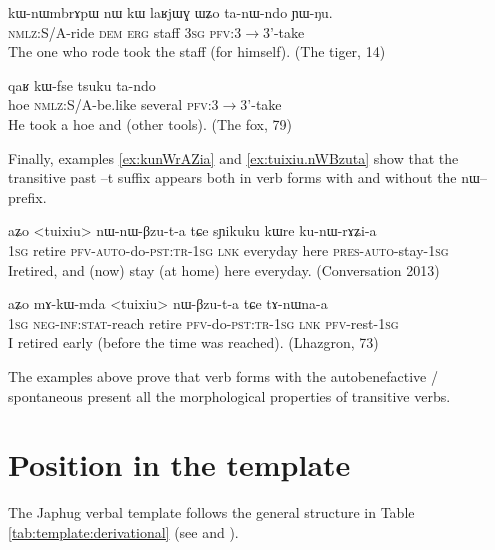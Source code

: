 \documentclass[oldfontcommands,oneside,a4paper,11pt]{article}
\newcommand{\ipa}[1]{{\phon \mbox{#1}}} %
\begin{document}
 \begin{exe}
\ex \label{ex:tAnWndo}
\gll
\ipa{kɯ-nɯmbrɤpɯ} 	\ipa{nɯ} 	\ipa{kɯ} 	\ipa{laʁjɯɣ} 	\ipa{ɯʑo} 	\ipa{ta-nɯ-ndo} 	\ipa{ɲɯ-ŋu.} \\
\textsc{nmlz}:S/A-ride \textsc{dem} \textsc{erg} staff \textsc{3sg} \textsc{pfv}:3$\rightarrow$3'-take  \\ 
\glt The one who rode took the staff (for himself). (The tiger, 14) 
\end{exe}

 \begin{exe}
\ex \label{ex:tando}
\gll 
\ipa{qaʁ} 	\ipa{kɯ-fse} 	\ipa{tsuku} 	\ipa{ta-ndo}  \\
hoe  \textsc{nmlz}:S/A-be.like several \textsc{pfv}:3$\rightarrow$3'-take  \\ 
 \glt He took a hoe and (other tools). (The fox, 79)
\end{exe} 

Finally, examples \ref{ex:kunWrAZia} and \ref{ex:tuixiu.nWBzuta} show that the transitive past \ipa{--t} suffix appears both in verb forms with and without the \ipa{nɯ--} prefix.

 \begin{exe}
\ex \label{ex:kunWrAZia}
\gll 
\ipa{aʑo} 	<tuixiu> 	\ipa{nɯ-nɯ-βzu-t-a} 	\ipa{tɕe} 	\ipa{sɲikuku} 	\ipa{kɯre} 	\ipa{ku-nɯ-rɤʑi-a} \\
\textsc{1sg} retire \textsc{pfv-auto}-do-\textsc{pst:tr-1sg} \textsc{lnk} everyday here \textsc{pres-auto}-stay-\textsc{1sg} \\
\glt Iretired, and (now) stay (at home) here everyday. (Conversation 2013)
\end{exe} 

 \begin{exe}
\ex \label{ex:tuixiu.nWBzuta}
\gll 
\ipa{aʑo} 	\ipa{mɤ-kɯ-mda} 	<tuixiu> 	\ipa{nɯ-βzu-t-a} \ipa{tɕe} 	\ipa{tɤ-nɯna-a} \\
\textsc{1sg} \textsc{neg-inf:stat}-reach retire \textsc{pfv}-do-\textsc{pst:tr-1sg} \textsc{lnk} \textsc{pfv}-rest-\textsc{1sg} \\
\glt I retired early (before the time was reached). (Lhazgron, 73)
\end{exe} 

The examples above prove that verb forms with the autobenefactive / spontaneous present all the morphological  properties of transitive verbs.

\section{Position in the template}
The Japhug verbal template follows the general structure in Table \ref{tab:template:derivational} (see \citealt{jacques12incorp} and \citealt{jacques13harmonization}). 
\end{document}
